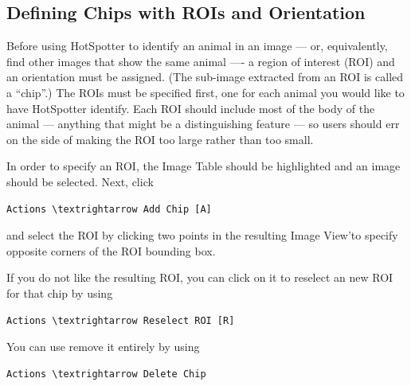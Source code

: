 \documentclass[a4paper,10pt]{article}
\begin{document}
    \subsection{Defining Chips with ROIs and Orientation}
        Before using HotSpotter to identify an animal in an image ---
        or, equivalently, find other images that show the same
        animal ---- a region of interest (ROI) and an orientation must
        be assigned.  (The sub-image extracted from an ROI is called a
        ``chip''.)  The ROIs must be specified first, one for each
        animal you would like to have HotSpotter identify.
%
        Each ROI should include most of the body of the animal ---
        anything that might be a distinguishing feature --- so users should err on the
        side of making the ROI too large rather than too small.

        In order to specify an ROI, the Image Table should be
        highlighted and an image should be selected.  Next, click
        \begin{Verbatim}[commandchars=\\\{\}]
        Actions \textrightarrow Add Chip [A]
        \end{Verbatim}
        and select the ROI by clicking two points in the resulting Image
        View'to specify opposite corners of the ROI bounding box.

        \;

        If you do not like the resulting ROI, you can click on it to reselect an new ROI for that chip by
        using
        \begin{Verbatim}[commandchars=\\\{\}]
        Actions \textrightarrow Reselect ROI [R]
        \end{Verbatim}
        You can use remove it entirely by using 
        \begin{Verbatim}[commandchars=\\\{\}]
        Actions \textrightarrow Delete Chip
        \end{Verbatim}
\end{document}
